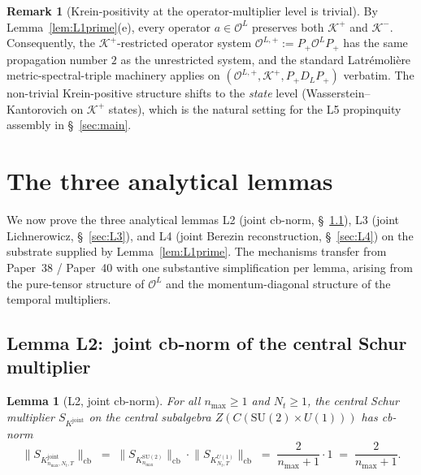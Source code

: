 \documentclass[11pt,a4paper]{article}
\theoremstyle{plain}
\newtheorem{lemma}[theorem]{Lemma}
\theoremstyle{definition}
\newtheorem{remark}[theorem]{Remark}
\newcommand{\nmax}{n_{\max}}
\newcommand{\Nt}{N_{t}}
\newcommand{\Krein}{\mathcal{K}}
\newcommand{\Op}{\mathcal{O}}
\newcommand{\cbnorm}[1]{\lVert #1 \rVert_{\mathrm{cb}}}
\newcommand{\SU}{\mathrm{SU}}
\newcommand{\Uone}{U(1)}
\newcommand{\DL}{D_{L}}
\newcommand{\Kjoint}{K^{\mathrm{joint}}}
\newcommand{\KSU}{K^{\SU(2)}}
\newcommand{\KU}{K^{\Uone}}
\newcommand{\Kplus}{\Krein^{+}}
\newcommand{\Kminus}{\Krein^{-}}
\newcommand{\Pplus}{P_{+}}
\begin{document}
\begin{remark}[Krein-positivity at the operator-multiplier level is
trivial]\label{rem:Kplus_trivial}
By Lemma~\ref{lem:L1prime}(e), every operator $a \in \Op^{L}$
preserves both $\Kplus$ and $\Kminus$. Consequently, the
$\Kplus$-restricted operator system $\Op^{L,+} := \Pplus
\Op^{L} \Pplus$ has the same propagation number $2$ as the unrestricted
system, and the standard Latr\'emoli\`ere metric-spectral-triple
machinery applies on $(\Op^{L,+}, \Kplus, \Pplus \DL \Pplus)$ verbatim.
The non-trivial Krein-positive structure shifts to the \emph{state}
level (Wasserstein--Kantorovich on $\Kplus$ states), which is the
natural setting for the L5 propinquity assembly in
\S~\ref{sec:main}.
\end{remark}

\section{The three analytical lemmas}\label{sec:lemmas}

We now prove the three analytical lemmas L2 (joint cb-norm,
\S~\ref{sec:L2}), L3 (joint Lichnerowicz, \S~\ref{sec:L3}), and L4
(joint Berezin reconstruction, \S~\ref{sec:L4}) on the substrate
supplied by Lemma~\ref{lem:L1prime}. The mechanisms transfer from
Paper~38 / Paper~40 with one substantive simplification per lemma,
arising from the pure-tensor structure of $\Op^{L}$ and the
momentum-diagonal structure of the temporal multipliers.

\subsection{Lemma L2:\ joint cb-norm of the central Schur multiplier}
\label{sec:L2}

\begin{lemma}[L2, joint cb-norm]\label{lem:L2}
For all $\nmax \ge 1$ and $\Nt \ge 1$, the central Schur multiplier
$S_{\Kjoint}$ on the central subalgebra
$Z(C(\SU(2) \times \Uone))$ has cb-norm
\begin{equation}\label{eq:L2_main}
   \cbnorm{S_{\Kjoint_{\nmax,\Nt,T}}}
   \;=\; \cbnorm{S_{\KSU_{\nmax}}} \cdot \cbnorm{S_{\KU_{\Nt,T}}}
   \;=\; \frac{2}{\nmax + 1} \cdot 1
   \;=\; \frac{2}{\nmax + 1}.
\end{equation}
\end{lemma}
\end{document}
